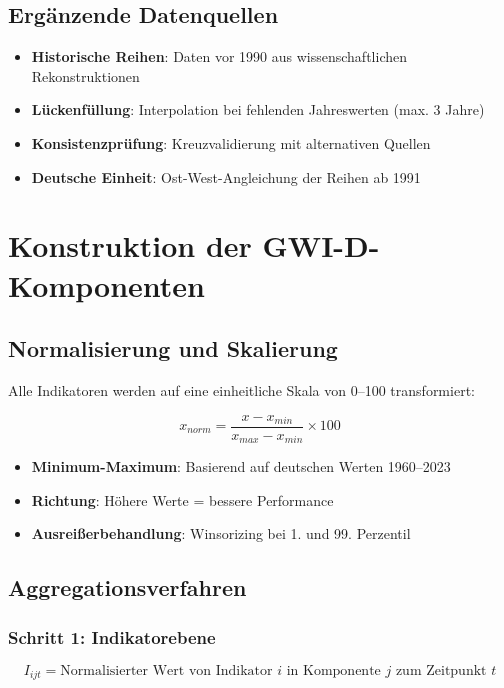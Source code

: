 \subsection{Ergänzende Datenquellen}

\begin{itemize}
    \item \textbf{Historische Reihen}: Daten vor 1990 aus wissenschaftlichen Rekonstruktionen
    \item \textbf{Lückenfüllung}: Interpolation bei fehlenden Jahreswerten (max. 3 Jahre)
    \item \textbf{Konsistenzprüfung}: Kreuzvalidierung mit alternativen Quellen
    \item \textbf{Deutsche Einheit}: Ost-West-Angleichung der Reihen ab 1991
\end{itemize}

\section{Konstruktion der GWI-D-Komponenten}

\subsection{Normalisierung und Skalierung}

Alle Indikatoren werden auf eine einheitliche Skala von 0–100 transformiert:

\[
x_{norm} = \frac{x - x_{min}}{x_{max} - x_{min}} \times 100
\]

\begin{itemize}
    \item \textbf{Minimum-Maximum}: Basierend auf deutschen Werten 1960–2023
    \item \textbf{Richtung}: Höhere Werte = bessere Performance
    \item \textbf{Ausreißerbehandlung}: Winsorizing bei 1. und 99. Perzentil
\end{itemize}

\subsection{Aggregationsverfahren}

\subsubsection{Schritt 1: Indikatorebene}

\[
I_{ijt} = \text{Normalisierter Wert von Indikator } i \text{ in Komponente } j \text{ zum Zeitpunkt } t
\]


